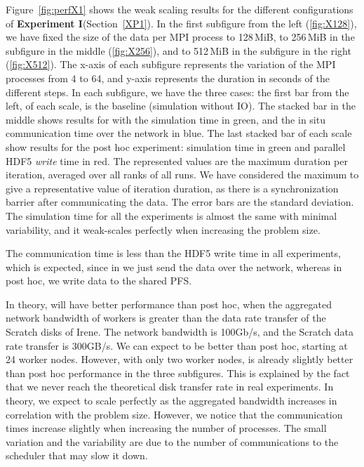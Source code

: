 Figure~\ref{fig:perfX1} shows the weak scaling results for the different configurations of \textbf{Experiment I}(Section~\ref{XP1}). In the first subfigure from the left (\ref{fig:X128}), we have fixed the size of the data per MPI process to 128\,MiB, to 256\,MiB in the subfigure in the middle (\ref{fig:X256}), and to 512\,MiB in the subfigure in the right (\ref{fig:X512}). 
The x-axis of each subfigure represents the variation of the MPI processes from 4 to 64, and y-axis represents the duration in seconds of the different steps.
In each subfigure, we have the three cases: the first bar from the left, of each scale,  is the baseline (simulation without IO). 
The stacked bar in the middle shows results for \deisa with the  simulation time in green, and the in situ communication time over the network in blue. The last stacked bar of each scale show results for the post hoc experiment: simulation time in green and parallel HDF5 \textit{write} time in red.
The represented values are the maximum duration per iteration, averaged over all ranks of all runs. We have considered the maximum to give a representative value of iteration duration, as there is a synchronization barrier after communicating the data.
The error bars are the standard deviation. 
The simulation time for all the experiments is almost the same with minimal variability, and it weak-scales perfectly when increasing the problem size.

The \deisa communication time is less than the HDF5 write time in all experiments, which is expected, since in \deisa we just send the data over the network, whereas in post hoc, we write data to the shared PFS. 

In theory, \deisa will have better performance than post hoc,  when the aggregated network bandwidth of \dask workers is greater than the data rate transfer of the Scratch disks of Irene. The network bandwidth is 100Gb/s, and the Scratch data rate transfer is 300GB/s. We can expect to be better than post hoc, starting at 24 worker nodes.
However, with only two worker nodes, \deisa is already slightly better than post hoc performance in the three subfigures. This is  explained by the fact that we never reach the theoretical disk transfer rate in real experiments.
In theory, we expect \deisa to scale perfectly as the aggregated bandwidth increases in correlation with the problem size. However, we notice that the \deisa communication times increase slightly when increasing the number of processes. 
The small variation and the variability are due to the number of communications to the \dask scheduler that may slow it down.  

